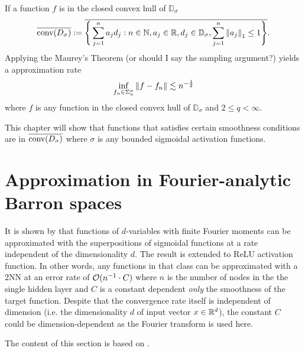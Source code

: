 If a function $f$ is in the closed convex hull of $\mathbb{D}_{\sigma}$
\begin{equation}
    \overline{\textnormal{conv}(D_{\sigma})} :=
    \overline{
        \Bigg\{ 
            \sum_{j=1}^n a_j d_j: 
            n\in\mathbb{N}, a_j\in\mathbb{R}, d_j\in\mathbb{D}_{\sigma}, 
            \sum_{j=1}^n \left\| a_j \right\|_1 \leq 1
        \Bigg\}
    }.
\end{equation}
Applying the Maurey's Theorem (\TODO or should I say the sampling argument?)
yields a approximation rate
\begin{equation}
    \inf_{f_n\in\Sigma_n^{\sigma}} \left\| f - f_n \right\| 
    \lesssim n^{-\frac{1}{2}}
\end{equation}
where $f$ is any function in the closed convex hull of $\mathbb{D}_{\sigma}$
and $2 \leq q < \infty$.

This chapter will show that functions that satisfies certain smoothness
conditions are in $\overline{\textnormal{conv}(D_{\sigma})}$ where $\sigma$ is any bounded
sigmoidal activation functions.


\section{Approximation in Fourier-analytic Barron spaces}
\label{sec:spectral_norm}

It is shown by \cite{barronUniversalApproximationBounds1993} that functions of
$d$-variables with finite Fourier moments can be approximated with the
superpositions of sigmoidal functions at a rate independent of the
dimensionality $d$. The result is extended to ReLU activation function. In other
words, any functions in that class can be approximated with a 2NN at an error
rate of $\mathcal{O}(n^{-1} \cdot C)$ where $n$ is the number of nodes in the the
single hidden layer and $C$ is a constant dependent \textit{only} the smoothness
of the target function. Despite that the convergence rate itself is independent
of dimension (i.e. the dimensionality $d$ of input vector $x\in\mathbb{R}^d$), the
constant $C$ could be dimension-dependent as the Fourier transform is used here.

The content of this section is based on
\cite{barronUniversalApproximationBounds1993}.

